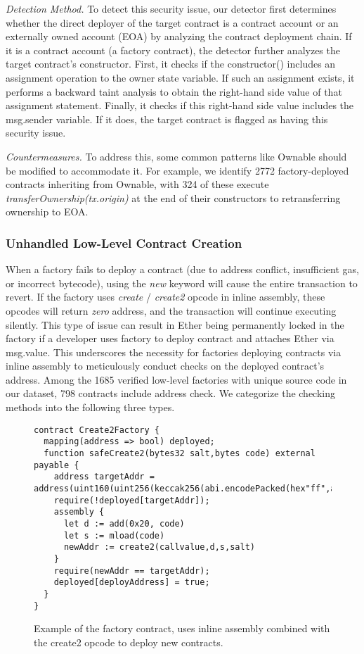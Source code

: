 \documentclass[acmsmall,screen]{acmart}
\begin{document}
	\textit{Detection Method.} To detect this security issue, our detector first determines whether the direct deployer of the target contract is a contract account or an externally owned account (EOA) by analyzing the contract deployment chain. If it is a contract account (a factory contract), the detector further analyzes the target contract's constructor. First, it checks if the constructor() includes an assignment operation to the owner state variable. If such an assignment exists, it performs a backward taint analysis to obtain the right-hand side value of that assignment statement. Finally, it checks if this right-hand side value includes the msg.sender variable. If it does, the target contract is flagged as having this security issue.

	\textit{Countermeasures.} To address this, some common patterns like Ownable should be modified to accommodate it. For example, we identify 2772 factory-deployed contracts inheriting from Ownable, with 324 of these execute \textit{transferOwnership(tx.origin)} at the end of  their constructors to retransferring ownership to EOA.


	\subsubsection{Unhandled Low-Level Contract Creation}
	When a factory fails to deploy a contract (due to address conflict, insufficient gas, or incorrect bytecode), using the \textit{new} keyword will cause the entire transaction to revert. If the factory uses \textit{create} / \textit{create2} opcode in inline assembly, these opcodes will return \textit{zero} address, and the transaction will continue executing silently. This type of issue can result in Ether being permanently locked in the factory if a developer uses factory to deploy contract and attaches Ether via msg.value. This underscores the necessity for factories deploying contracts via inline assembly to meticulously conduct checks on the deployed contract's address. Among the 1685 verified low-level factories with unique source code in our dataset, 798 contracts include address check. We categorize the checking methods into the following three types.

	\begin{figure}[htbp]
		\begin{minipage}{\linewidth}
			\begin{lstlisting}
contract Create2Factory {
  mapping(address => bool) deployed;
  function safeCreate2(bytes32 salt,bytes code) external payable {
    address targetAddr = address(uint160(uint256(keccak256(abi.encodePacked(hex"ff",address(this),salt,keccak256(abi.encodePacked(code)))))));
    require(!deployed[targetAddr]);
    assembly {
      let d := add(0x20, code)
      let s := mload(code)
      newAddr := create2(callvalue,d,s,salt)
    }
    require(newAddr == targetAddr);
    deployed[deployAddress] = true;
  }
}
			\end{lstlisting}
		\end{minipage}
		\caption{Example of the factory contract, uses inline assembly combined with the create2 opcode to deploy new contracts.}
		\label{lst:lowlevel}
	\end{figure}
\end{document}
